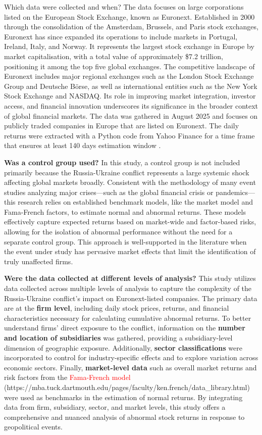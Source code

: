 \documentclass[12pt,a4paper]{article}
\begin{document}
Which data were collected and when?
The data focuses on large corporations listed on the European Stock Exchange, known as Euronext. Established in 2000 through the consolidation of the Amsterdam, Brussels, and Paris stock exchanges, Euronext has since expanded its operations to include markets in Portugal, Ireland, Italy, and Norway. It represents the largest stock exchange in Europe by market capitalisation, with a total value of approximately \$7.2 trillion, positioning it among the top five global exchanges. The competitive landscape of Euronext includes major regional exchanges such as the London Stock Exchange Group and Deutsche Börse, as well as international entities such as the New York Stock Exchange and NASDAQ. Its role in improving market integration, investor access, and financial innovation underscores its significance in the broader context of global financial markets. 
The data was gathered in August 2025 and focuses on publicly traded companies in Europe that are listed on Euronext. The daily returns were extracted with a Python code from Yahoo Finance for a time frame that ensures at least 140 days estimation window .  

\textbf{Was a control group used?}
In this study, a control group is not included primarily because the Russia-Ukraine conflict represents a large systemic shock affecting global markets broadly. Consistent with the methodology of many event studies analyzing major crises—such as the global financial crisis or pandemics—this research relies on established benchmark models, like the market model and Fama-French factors, to estimate normal and abnormal returns. These models effectively capture expected returns based on market-wide and factor-based risks, allowing for the isolation of abnormal performance without the need for a separate control group. This approach is well-supported in the literature when the event under study has pervasive market effects that limit the identification of truly unaffected firms.


\textbf{Were the data collected at different levels of analysis?}
This study utilizes data collected across multiple levels of analysis to capture the complexity of the Russia-Ukraine conflict’s impact on Euronext-listed companies. The primary data are at the \textbf{firm level}, including daily stock prices, returns, and financial characteristics necessary for calculating cumulative abnormal returns. To better understand firms’ direct exposure to the conflict, information on the \textbf{number and location of subsidiaries} was gathered, providing a subsidiary-level dimension of geographic exposure. Additionally, \textbf{sector classifications} were incorporated to control for industry-specific effects and to explore variation across economic sectors. Finally, \textbf{market-level data} such as overall market returns and risk factors from the \textcolor{red}{Fama-French model} (https://mba.tuck.dartmouth.edu/pages/faculty/ken.french/data_library.html) were used as benchmarks in the estimation of normal returns. By integrating data from firm, subsidiary, sector, and market levels, this study offers a comprehensive and nuanced analysis of abnormal stock returns in response to geopolitical events.
\end{document}
